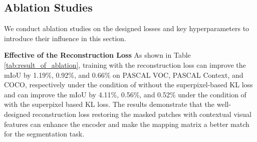 \documentclass{article}
\theoremstyle{plain}
\theoremstyle{definition}
\theoremstyle{remark}
\begin{document}
\subsection{Ablation Studies}
We conduct ablation studies on the designed losses and key hyperparameters to introduce their influence in this section.

\vspace{0.1cm}
\noindent
\textbf{Effective of the Reconstruction Loss} \quad
 As shown in Table \ref{tab:result_of_ablation}, training with the reconstruction loss can improve the mIoU by 1.19\%, 0.92\%, and 0.66\% on PASCAL VOC, PASCAL Context, and COCO, respectively under the condition of without the superpixel-based KL loss and can improve the mIoU by 4.11\%, 0.56\%, and 0.52\% under the condition of with the superpixel based KL loss. The results demonstrate that the well-designed reconstruction loss restoring the masked patches with contextual visual features can enhance the encoder and make the mapping matrix a better match for the segmentation task.
\end{document}
